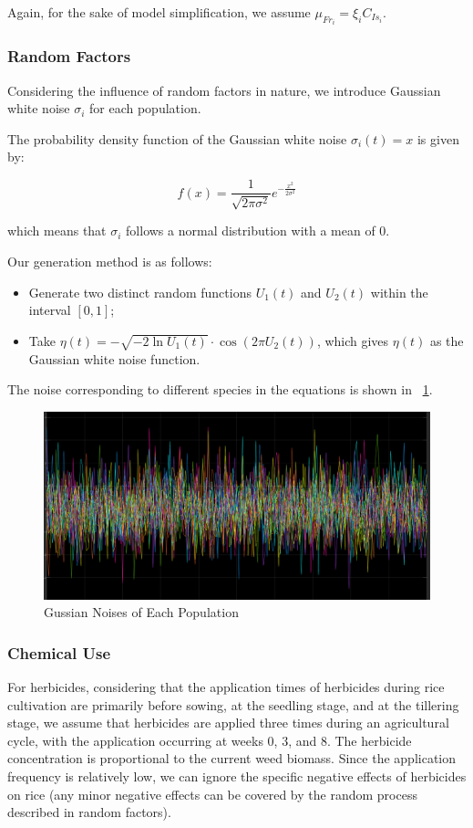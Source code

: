 \documentclass{HZNUMCM}
\begin{document}
        Again, for the sake of model simplification, we assume \( \mu_{Fr_i} = \xi_{i} C_{Is_i} \).
      \subsubsection{Random Factors}
        Considering the influence of random factors in nature, we introduce Gaussian white noise \(\sigma_i\) for each population.
        
        The probability density function of the Gaussian white noise \(\sigma_i(t) = x\) is given by:

        \begin{equation}
        f(x) = \frac{1}{\sqrt{2\pi\sigma^2}} e^{-\frac{x^2}{2\sigma^2}}
        \end{equation}

        which means that \(\sigma_i\) follows a normal distribution with a mean of 0.
        
        Our generation method is as follows:
        \begin{itemize}
            \item Generate two distinct random functions \(U_1(t)\) and \(U_2(t)\) within the interval \([0, 1]\);
            \item Take \(\eta(t) = -\sqrt{-2 \ln U_1(t)} \cdot \cos(2\pi U_2(t))\), which gives \(\eta(t)\) as the Gaussian white noise function.
        \end{itemize}
        The noise corresponding to different species in the equations is shown in \figurename~\ref{fig:GussianNoise}.
        \begin{figure}[H]
          \centering
          \includegraphics[width=0.5\linewidth]{images/GussianNoise.png}
          \caption{Gussian Noises of Each Population}
          \label{fig:GussianNoise}
        \end{figure}
      \subsubsection{Chemical Use}
        For herbicides, considering that the application times of herbicides during rice cultivation are primarily before sowing, 
        at the seedling stage, and at the tillering stage, we assume that herbicides are applied three times during an agricultural cycle, 
        with the application occurring at weeks 0, 3, and 8. The herbicide concentration is proportional to the current weed biomass. 
        Since the application frequency is relatively low, we can ignore the specific negative effects of herbicides on rice 
        (any minor negative effects can be covered by the random process described in random factors).
\end{document}
